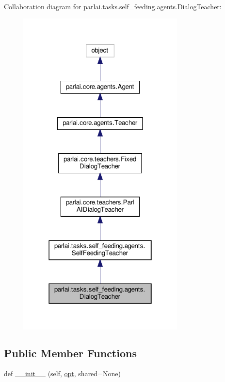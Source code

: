 Collaboration diagram for parlai.\+tasks.\+self\+\_\+feeding.\+agents.\+Dialog\+Teacher\+:\nopagebreak
\begin{figure}[H]
\begin{center}
\leavevmode
\includegraphics[width=238pt]{d2/d58/classparlai_1_1tasks_1_1self__feeding_1_1agents_1_1DialogTeacher__coll__graph}
\end{center}
\end{figure}
\subsection*{Public Member Functions}
\begin{DoxyCompactItemize}
\item 
def \hyperlink{classparlai_1_1tasks_1_1self__feeding_1_1agents_1_1DialogTeacher_a4d54bccea69db40c88a1a9c83b0bad78}{\+\_\+\+\_\+init\+\_\+\+\_\+} (self, \hyperlink{classparlai_1_1core_1_1agents_1_1Teacher_a3ce6243860ce978a897922863ed32fa4}{opt}, shared=None)
\end{DoxyCompactItemize}
